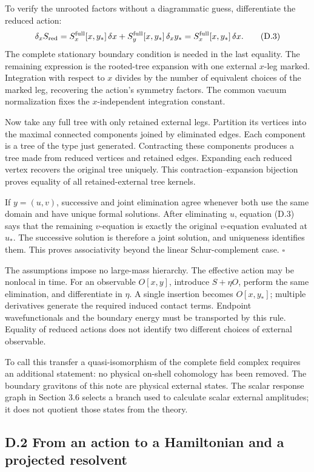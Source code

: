 To verify the unrooted factors without a diagrammatic guess, differentiate the reduced action: \[
\delta_x S_{\rm red}
=S_x^{\rm full}[x,y_*]\,\delta x
+S_y^{\rm full}[x,y_*]\,\delta_xy_*
=S_x^{\rm full}[x,y_*]\,\delta x.
\tag{D.3}
\] The complete stationary boundary condition is needed in the last equality. The remaining expression is the rooted-tree expansion with one external \(x\)-leg marked. Integration with respect to \(x\) divides by the number of equivalent choices of the marked leg, recovering the action's symmetry factors. The common vacuum normalization fixes the \(x\)-independent integration constant.

Now take any full tree with only retained external legs. Partition its vertices into the maximal connected components joined by eliminated edges. Each component is a tree of the type just generated. Contracting these components produces a tree made from reduced vertices and retained edges. Expanding each reduced vertex recovers the original tree uniquely. This contraction--expansion bijection proves equality of all retained-external tree kernels.

If \(y=(u,v)\), successive and joint elimination agree whenever both use the same domain and have unique formal solutions. After eliminating \(u\), equation (D.3) says that the remaining \(v\)-equation is exactly the original \(v\)-equation evaluated at \(u_*\). The successive solution is therefore a joint solution, and uniqueness identifies them. This proves associativity beyond the linear Schur-complement case. \(\square\)

The assumptions impose no large-mass hierarchy. The effective action may be nonlocal in time. For an observable \(O[x,y]\), introduce \(S+\eta O\), perform the same elimination, and differentiate in \(\eta\). A single insertion becomes \(O[x,y_*]\); multiple derivatives generate the required induced contact terms. Endpoint wavefunctionals and the boundary energy must be transported by this rule. Equality of reduced actions does not identify two different choices of external observable.

To call this transfer a quasi-isomorphism of the complete field complex requires an additional statement: no physical on-shell cohomology has been removed. The boundary gravitons of this note are physical external states. The scalar response graph in Section 3.6 selects a branch used to calculate scalar external amplitudes; it does not quotient those states from the theory.

\hypertarget{d.2-from-an-action-to-a-hamiltonian-and-a-projected-resolvent}{%
\subsection{D.2 From an action to a Hamiltonian and a projected resolvent}\label{d.2-from-an-action-to-a-hamiltonian-and-a-projected-resolvent}}

